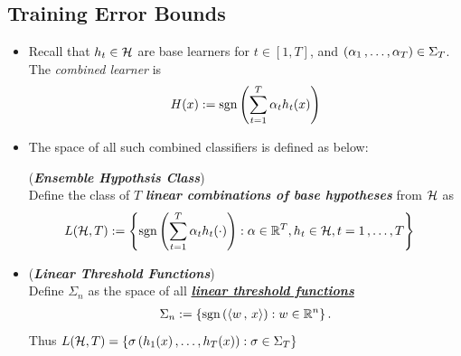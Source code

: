 \documentclass[11pt]{article}
\begin{document}
\subsection{Training Error Bounds}
\begin{itemize}
\item \begin{remark}
Recall that $h_t \in {\mathcal H}$ are base learners for $t \in [1,T]$, and $(\alpha_1 \,{,}\ldots{,}\, \alpha_{T}) \in \Sigma_{T}$. The \emph{combined learner} is
\begin{align*}
H(x) := \text{sgn}\left(\sum_{t=1}^{T}\alpha_t h_t(x)\right)
\end{align*}
\end{remark}

\item The space of all such combined classifiers is defined as below:
\begin{definition}(\textbf{\emph{Ensemble Hypothsis Class}})\\
Define the class of $T$ \emph{\textbf{linear combinations of base hypotheses}} from ${\mathcal H}$ as
\begin{align}
L({\mathcal H}, T) &:=  \left\{\text{sgn}\left(\sum_{t=1}^{T}\alpha_t h_t(\cdot )\right):  \alpha \in {\mathbb R}^{T},  h_t \in {\mathcal H},  t = 1\,{,}\ldots{,}\, T \right\}  \label{def: linear_ensemble_class}
\end{align}
\end{definition}

\item \begin{definition}(\textbf{\emph{Linear Threshold Functions}})\\
Define $\Sigma_n$  as the space of all \underline{\textbf{\emph{linear threshold functions}}}
\begin{align*}
\Sigma_n := \left\{\text{sgn}\left(\left\langle w\,,\, x \right\rangle\right):  w \in {\mathbb R}^n\right\}.
\end{align*} Thus $L({\mathcal H}, T) = \left\{\sigma\left(h_1(x) \,{,}\ldots{,}\, h_{T}(x)\right) : \sigma \in \Sigma_{T}\right\}$
\end{definition}




\end{itemize}
\end{document}

